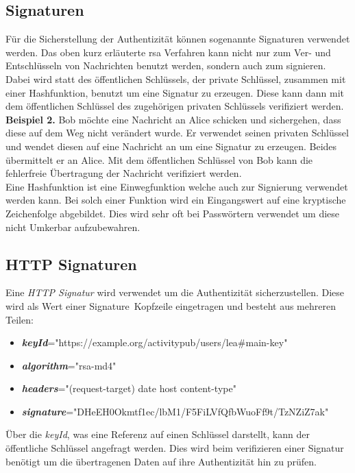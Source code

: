 	\subsection{Signaturen}
	Für die Sicherstellung der Authentizität können sogenannte Signaturen verwendet werden. Das oben kurz erläuterte \gls{rsa} Verfahren kann nicht nur zum Ver- und Entschlüsseln von Nachrichten benutzt werden, sondern auch zum signieren. Dabei wird statt des öffentlichen Schlüssels, der private Schlüssel, zusammen mit einer Hashfunktion, benutzt um eine Signatur zu erzeugen. Diese kann dann mit dem öffentlichen Schlüssel des zugehörigen privaten Schlüssels verifiziert werden.~\\
	
	\textbf{Beispiel 2.} Bob möchte eine Nachricht an Alice schicken und sichergehen, dass diese auf dem Weg nicht verändert wurde. Er verwendet seinen privaten Schlüssel und wendet diesen auf eine Nachricht an um eine Signatur zu erzeugen. Beides übermittelt er an Alice. Mit dem öffentlichen Schlüssel von Bob kann die fehlerfreie Übertragung der Nachricht verifiziert werden.~\\
	
	Eine Hashfunktion ist eine Einwegfunktion welche auch zur Signierung verwendet werden kann. Bei solch einer Funktion wird ein Eingangswert auf eine kryptische Zeichenfolge abgebildet. Dies wird sehr oft bei Passwörtern verwendet um diese nicht Umkerbar aufzubewahren.~\\
	\subsection{HTTP Signaturen}
	\label{subsec:http-signaturen}
	Eine \textit{HTTP Signatur} wird verwendet um die Authentizität sicherzustellen. Diese wird als Wert einer \glqq Signature\grqq~Kopfzeile eingetragen und besteht aus mehreren Teilen:
	\begin{itemize}
		\item \textit{\textbf{keyId}}="https://example.org/activitypub/users/lea\#main-key"
		\item \textit{\textbf{algorithm}}="rsa-md4"
		\item \textit{\textbf{headers}}="(request-target) date host content-type"
		\item \textit{\textbf{signature}}="DHeEH0Okmtf1ec/lbM1/F5FiLVfQfbWuoFf9t/TzNZiZ7ak"
	\end{itemize}
	Über die \textit{keyId}, was eine Referenz auf einen Schlüssel darstellt, kann der öffentliche Schlüssel angefragt werden. Dies wird beim verifizieren einer Signatur benötigt um die übertragenen Daten auf ihre Authentizität hin zu prüfen.~\\
	
